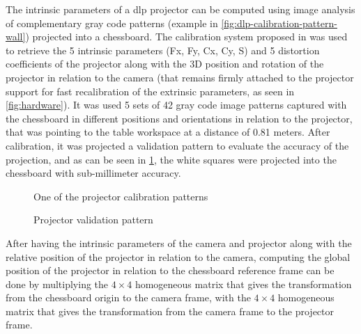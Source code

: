 The intrinsic parameters of a \gls{dlp} projector can be computed using image analysis of complementary gray code patterns (example in \cref{fig:dlp-calibration-pattern-wall}) projected into a chessboard. The calibration system proposed in \cite{Moreno2012} was used to retrieve the 5 intrinsic parameters (Fx, Fy, Cx, Cy, S) and 5 distortion coefficients of the projector along with the 3D position and rotation of the projector in relation to the camera (that remains firmly attached to the projector support for fast recalibration of the extrinsic parameters, as seen in \cref{fig:hardware}). It was used 5 sets of 42 gray code image patterns captured with the chessboard in different positions and orientations in relation to the projector, that was pointing to the table workspace at a distance of 0.81 meters. After calibration, it was projected a validation pattern to evaluate the accuracy of the projection, and as can be seen in \cref{fig:dlp-projected-chessboard}, the white squares were projected into the chessboard with sub-millimeter accuracy.

\begin{figure}[H]
	\begin{floatrow}[2]
		{\caption{One of the projector calibration patterns}\label{fig:dlp-calibration-pattern-wall}}
		{\caption{Projector validation pattern}\label{fig:dlp-projected-chessboard}}
	\end{floatrow}
\end{figure}

After having the intrinsic parameters of the camera and projector along with the relative position of the projector in relation to the camera, computing the global position of the projector in relation to the chessboard reference frame can be done by multiplying the $4 \times 4$ homogeneous matrix that gives the transformation from the chessboard origin to the camera frame, with the $4 \times 4$ homogeneous matrix that gives the transformation from the camera frame to the projector frame.



